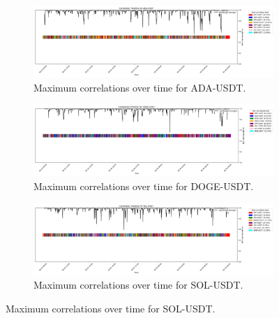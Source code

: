 \documentclass[11pt]{article}
\begin{document}
\begin{figure}[p]
    \captionsetup[subfigure]{labelformat=empty}
    \centering
    \begin{subfigure}{\linewidth}
        \centering
        \includegraphics[width=\linewidth]{../assets/correlations/ADA-USDT.png}
        \caption{Maximum correlations over time for ADA-USDT.}
        \label{fig:ada-corr}
    \end{subfigure}

    \vspace{0.1cm}

    \begin{subfigure}{\linewidth}
        \centering
        \includegraphics[width=\linewidth]{../assets/correlations/DOGE-USDT.png}
        \caption{Maximum correlations over time for DOGE-USDT.}
        \label{fig:doge-corr}
    \end{subfigure}

    \vspace{0.1cm}

    \begin{subfigure}{\linewidth}
        \centering
        \includegraphics[width=\linewidth]{../assets/correlations/SOL-USDT.png}
        \caption{Maximum correlations over time for SOL-USDT.}
        \label{fig:sol-corr}
    \end{subfigure}


\end{figure}
\end{document}
